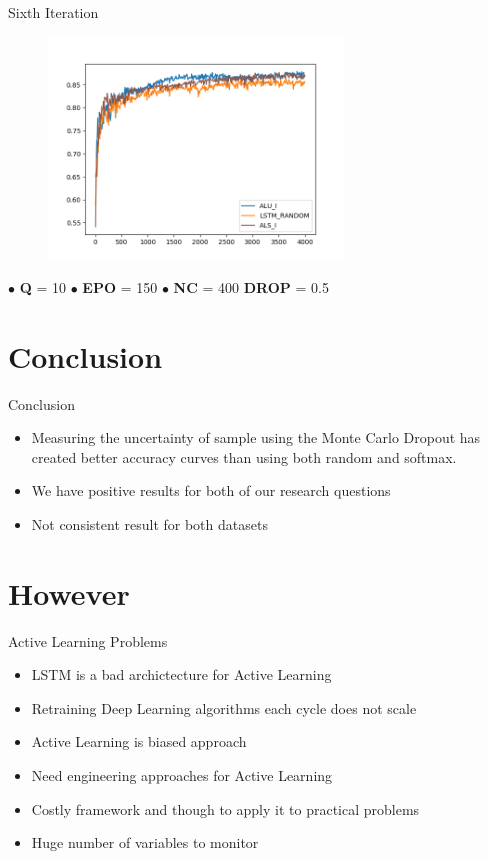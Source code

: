 \documentclass[10pt]{beamer}
\begin{document}
\begin{frame}[fragile]{Sixth Iteration}
\begin{figure}[H]
    \centering
    \includegraphics[width=0.7\textwidth]{images/subj_n150_q10_softmax_bald_comparison}
\end{figure}

\hspace{0.5cm} $\bullet$ \textbf{Q} = 10 \hspace{0.5cm} $\bullet$ \textbf{EPO} = 150 \hspace{0.5cm} $\bullet$ \textbf{NC} = 400 \hspace{0.5cm} \textbf{DROP} = 0.5
\end{frame}

\section{Conclusion}

\begin{frame}[fragile]{Conclusion}
\begin{itemize}
\item Measuring the uncertainty of sample using the Monte Carlo Dropout has created better
      accuracy curves than using both random and softmax.
\item We have positive results for both of our research questions
\item Not consistent result for both datasets
\end{itemize}
\end{frame}

\section{However}

\begin{frame}[fragile]{Active Learning Problems}
\begin{itemize}
\item LSTM is a bad archictecture for Active Learning
\item Retraining Deep Learning algorithms each cycle does not scale
\item Active Learning is biased approach
\item Need engineering approaches for Active Learning
\item Costly framework and though to apply it to practical problems
\item Huge number of variables to monitor
\end{itemize}
\end{frame}
\end{document}
